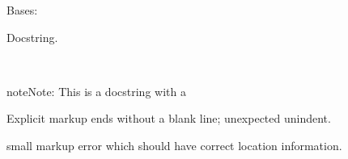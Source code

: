 \documentclass[letterpaper,10pt,english]{sphinxmanual}
\begin{document}

\begin{fulllineitems}
\label{autodoc:test_autodoc.CustomDict}
Bases: 

Docstring.

\end{fulllineitems}


\begin{fulllineitems}
\label{autodoc:autodoc_fodder.MarkupError}~
\begin{notice}{note}{Note:}
This is a docstring with a
\end{notice}

Explicit markup ends without a blank line; unexpected unindent.


small markup error which should have
correct location information.

\end{fulllineitems}

\end{document}
